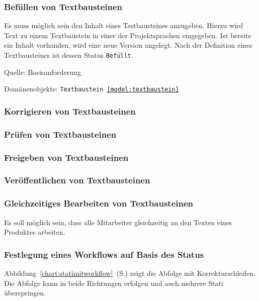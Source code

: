 \subsubsection{Befüllen von Textbausteinen}

Es muss möglich sein den Inhalt eines Testbausteines anzugeben. Hierzu wird Text zu einem Textbaustein in einer der Projektsprachen eingegeben. Ist bereits ein Inhalt vorhanden, wird eine neue Version angelegt. Nach der Definition eines Textbausteines ist dessen Status \texttt{Befüllt}.

\textsf{Quelle:} Basisanforderung

\textsf{Domänenobjekte:} \texttt{Textbaustein \ref{model:textbaustein}}

\TODO

\subsubsection{Korrigieren von Textbausteinen}

\subsubsection{Prüfen von Textbausteinen}

\subsubsection{Freigeben von Textbausteinen}

\subsubsection{Veröffentlichen von Textbausteinen}

\subsubsection{Gleichzeitiges Bearbeiten von Textbausteinen}

Es soll möglich sein, dass alle  Mitarbeiter gleichzeitig an den Texten eines Produktes arbeiten.

\subsubsection{Festlegung eines Workflows auf Basis des Status}

Abbildung~\ref{chart:statimitworkflow}~(S.\pageref{chart:statimitworkflow}) zeigt die Abfolge mit Korrekturschleifen. Die Abfolge kann in beide Richtungen erfolgen und auch mehrere Stati überspringen.

